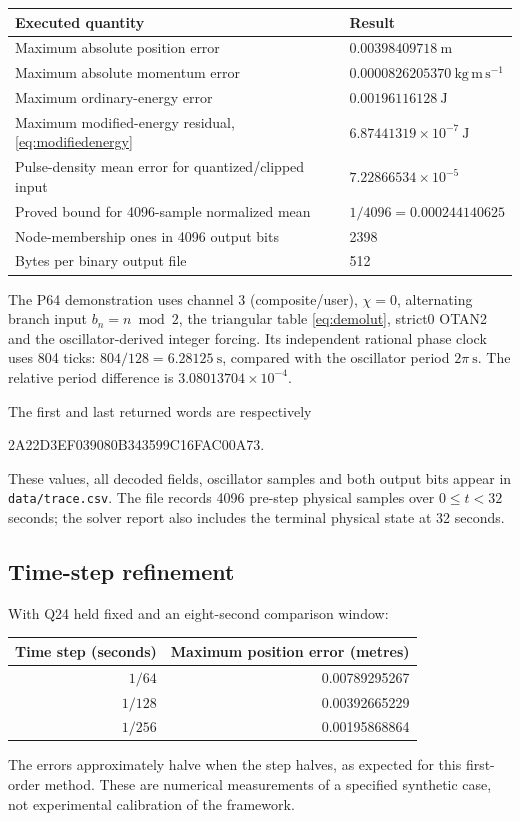 \documentclass[11pt,a4paper]{article}
\numberwithin{equation}{section}
\begin{document}
\begin{tabularx}{\textwidth}{@{}Y p{56mm}@{}}
\toprule
Executed quantity & Result\\
\midrule
Maximum absolute position error & $0.00398409718\ \mathrm m$\\
Maximum absolute momentum error & $0.0000826205370\ \mathrm{kg\,m\,s^{-1}}$\\
Maximum ordinary-energy error & $0.00196116128\ \mathrm J$\\
Maximum modified-energy residual, \eqref{eq:modifiedenergy} & $6.87441319\times10^{-7}\ \mathrm J$\\
Pulse-density mean error for quantized/clipped input & $7.22866534\times10^{-5}$\\
Proved bound for 4096-sample normalized mean & $1/4096=0.000244140625$\\
Node-membership ones in 4096 output bits & 2398\\
Bytes per binary output file & 512\\
\bottomrule
\end{tabularx}
The P64 demonstration uses channel 3 (composite/user), $\chi=0$, alternating branch input $b_n=n\bmod2$, the triangular table \eqref{eq:demolut}, strict0 OTAN2 and the oscillator-derived integer forcing. Its independent rational phase clock uses 804 ticks: $804/128=6.28125\ \mathrm s$, compared with the oscillator period $2\pi\ \mathrm s$. The relative period difference is $3.08013704\times10^{-4}$.

The first and last returned words are respectively
\begin{center}\ttfamily
2A22D3EF039080B3\qquad 43599C16FAC00A73.
\end{center}
These values, all decoded fields, oscillator samples and both output bits appear in \texttt{data/trace.csv}. The file records 4096 pre-step physical samples over $0\le t<32$ seconds; the solver report also includes the terminal physical state at 32 seconds.

\subsection{Time-step refinement}
With Q24 held fixed and an eight-second comparison window:
\begin{center}
\begin{tabular}{@{}rr@{}}
\toprule
Time step (seconds) & Maximum position error (metres)\\
\midrule
$1/64$ & 0.00789295267\\
$1/128$ & 0.00392665229\\
$1/256$ & 0.00195868864\\
\bottomrule
\end{tabular}
\end{center}
The errors approximately halve when the step halves, as expected for this first-order method. These are numerical measurements of a specified synthetic case, not experimental calibration of the framework.
\end{document}
